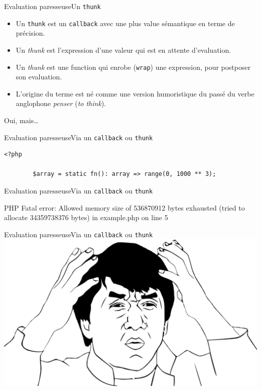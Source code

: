 \begin{frame}{Evaluation paresseuse}{Un \texttt{thunk}}
    \begin{itemize}[<+->]
        \item Un \texttt{thunk} est un \texttt{callback} avec une plus value
        sémantique en terme de précision.
        \item Un \textit{thunk} est l'expression d'une valeur qui est en attente
        d'evaluation.
        \item Un \textit{thunk} est une function qui enrobe (\texttt{wrap}) une
        expression, pour postposer son evaluation.
        \item L'origine du terme est né comme une version humoristique du passé
        du verbe anglophone \textit{penser} (\textit{to think}).
    \end{itemize}
\end{frame}

\begin{frameC}{Oui, mais\ldots}

\end{frameC}

\begin{frame}[fragile]{Evaluation paresseuse}{Via un \texttt{callback} ou \texttt{thunk}}
    \begin{lstlisting}[firstnumber=1]
        <?php

        $array = static fn(): array => range(0, 1000 ** 3);
    \end{lstlisting}
\end{frame}

\begin{frame}[fragile]{Evaluation paresseuse}{Via un \texttt{callback} ou \texttt{thunk}}
    \begin{spverbatim}
        PHP Fatal error: Allowed memory size of 536870912 bytes exhausted (tried to allocate 34359738376 bytes) in example.php on line 5
    \end{spverbatim}
\end{frame}

\begin{frame}[fragile]{Evaluation paresseuse}{Via un \texttt{callback} ou \texttt{thunk}}
    \includegraphics[width=\textwidth]{meme/wtf.png}
\end{frame}

